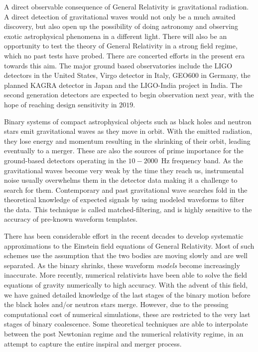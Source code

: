 
A direct observable consequence of General Relativity is gravitational
radiation. A direct detection of gravitational waves would not only be a much
awaited discovery, but also open up the possibility of doing astronomy and 
observing exotic astrophysical phenomena in a different light. There will 
also be an opportunity to test the theory of General Relativity in a strong 
field regime, which no past tests have probed. There are 
concerted efforts in the present era towards this aim. The major ground
based observatories include the LIGO detectors in the United States, Virgo
detector in Italy, GEO600 in Germany, the planned KAGRA detector in Japan
and the LIGO-India project in India. The second generation detectors are 
expected to begin observation next year, with the hope of reaching design
sensitivity in $2019$. 

Binary systems of compact astrophysical objects such as black holes and 
neutron stars emit gravitational waves as they move in orbit. With the emitted
radiation, they lose energy and momentum resulting in the shrinking of their 
orbit, leading eventually to a merger. These are also the sources of prime
importance for the ground-based detectors operating in the $10-2000$~Hz 
frequency band. As the gravitational waves become very weak by the time they 
reach us, instrumental noise usually overwhelms them in the detector data
making it a challenge to search for them. Contemporary and past gravitational
wave searches fold in the theoretical knowledge of expected signals by using
modeled waveforms to filter the data. This technique is called 
matched-filtering, and is highly sensitive to the accuracy of pre-known 
waveform templates. 

There has been considerable effort in the recent decades to develop systematic
approximations to the Einstein field equations of General Relativity. Most 
of such schemes use the assumption that the two bodies are moving slowly and 
are well separated. As the binary shrinks, these waveform {\it models} become 
increasingly inaccurate. More recently, numerical relativists have been 
able to solve the field equations of gravity numerically to high accuracy.
With the advent of this field, we have gained detailed knowledge of the last
stages of the binary motion before the black holes and/or neutron stars merge.
However, due to the pressing computational cost of numerical simulations, these
are restricted to the very last stages of binary coalescence. Some theoretical
techniques are able to interpolate between the post Newtonian regime and the 
numerical relativity regime, in an attempt to capture the entire inspiral and
merger process.


